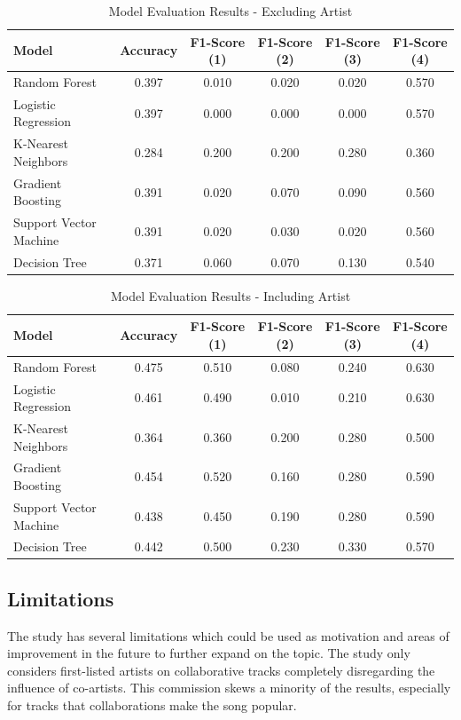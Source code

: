 \documentclass{article}
\begin{document}
\begin{table}[h]
\centering
\begin{tabular}{|l|c|c|c|c|c|}
\hline
Model & Accuracy & F1-Score (1) & F1-Score (2) & F1-Score (3) & F1-Score (4) \\
\hline
Random Forest & 0.397 & 0.010 & 0.020 & 0.020 & 0.570 \\
Logistic Regression & 0.397 & 0.000 & 0.000 & 0.000 & 0.570 \\
K-Nearest Neighbors & 0.284 & 0.200 & 0.200 & 0.280 & 0.360 \\
Gradient Boosting & 0.391 & 0.020 & 0.070 & 0.090 & 0.560 \\
Support Vector Machine & 0.391 & 0.020 & 0.030 & 0.020 & 0.560 \\
Decision Tree & 0.371 & 0.060 & 0.070 & 0.130 & 0.540 \\
\hline
\end{tabular}
\caption{Model Evaluation Results - Excluding Artist}
\label{table:results}
\end{table}


\begin{table}[h]
\centering
\begin{tabular}{|l|c|c|c|c|c|}
\hline
Model & Accuracy & F1-Score (1) & F1-Score (2) & F1-Score (3) & F1-Score (4) \\
\hline
Random Forest & 0.475 & 0.510 & 0.080 & 0.240 & 0.630 \\
Logistic Regression & 0.461 & 0.490 & 0.010 & 0.210 & 0.630 \\
K-Nearest Neighbors & 0.364 & 0.360 & 0.200 & 0.280 & 0.500 \\
Gradient Boosting & 0.454 & 0.520 & 0.160 & 0.280 & 0.590 \\
Support Vector Machine & 0.438 & 0.450 & 0.190 & 0.280 & 0.590 \\
Decision Tree & 0.442 & 0.500 & 0.230 & 0.330 & 0.570 \\
\hline
\end{tabular}
\caption{Model Evaluation Results - Including Artist}
\label{table:results}
\end{table}



\subsection{Limitations}

The study has several limitations which could be used as motivation and areas of improvement in the future to further expand on the topic. The study only considers first-listed artists on collaborative tracks completely disregarding the influence of co-artists. This commission skews a minority of the results, especially for tracks that collaborations make the song popular.
\end{document}
